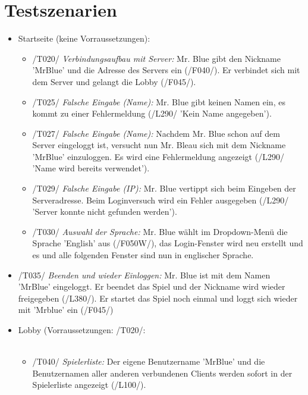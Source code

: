 \documentclass{article}
\begin{document}
\section{Testszenarien}
\begin{itemize}
	\item Startseite (keine Vorraussetzungen): \\
	\begin{itemize}
	
		\item /T020/ \textit{Verbindungsaufbau mit Server:} Mr. Blue gibt den Nickname 'MrBlue' und die Adresse des Servers ein (/F040/). Er verbindet sich mit dem Server und gelangt die Lobby (/F045/). 
		
		\item /T025/ \textit{Falsche Eingabe (Name):} Mr. Blue gibt keinen Namen ein, es kommt zu einer Fehlermeldung (/L290/ 'Kein Name angegeben').
		
		\item /T027/ \textit{Falsche Eingabe (Name):} Nachdem Mr. Blue schon auf dem Server eingeloggt ist, versucht nun Mr. Bleau sich mit dem Nickname 'MrBlue' einzuloggen. Es wird eine Fehlermeldung angezeigt (/L290/ 'Name wird bereits verwendet').
		
		\item /T029/ \textit{Falsche Eingabe (IP):} Mr. Blue vertippt sich beim Eingeben der Serveradresse. Beim Loginversuch wird ein Fehler ausgegeben (/L290/ 'Server konnte nicht gefunden werden').
		
		\item /T030/ \textit{Auswahl der Sprache:} Mr. Blue wählt im Dropdown-Menü die Sprache 'English' aus (/F050W/), das Login-Fenster wird neu erstellt und es und alle folgenden Fenster sind nun in englischer Sprache.
	\end{itemize}
	
		\item /T035/ \textit{Beenden und wieder Einloggen:} Mr. Blue ist mit dem Namen 'MrBlue' eingeloggt. Er beendet das Spiel und der Nickname wird wieder freigegeben (/L380/). Er startet das Spiel noch einmal und loggt sich wieder mit 'Mrblue' ein (/F045/)

	\item \gls{Lobby} (Vorraussetzungen: /T020/: \\ \\
	\begin{itemize}
	
		\item /T040/ \textit{Spielerliste:} Der eigene Benutzername 'MrBlue' und die Benutzernamen aller anderen verbundenen Clients werden sofort in der Spielerliste angezeigt (/L100/).
		

\end{itemize}
\end{itemize}
\end{document}

